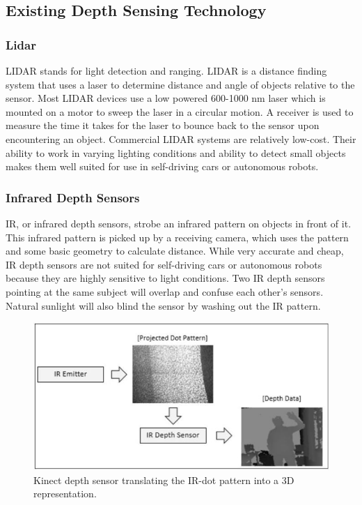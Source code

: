 \documentclass[onecolumn, draftclsnofoot,10pt, compsoc]{IEEEtran}
\makeatletter
\newcommand\captionof[1]{\def\@captype{#1}\caption}
\makeatother
\begin{document}
\begin{singlespace}
	\subsection{Existing Depth Sensing Technology}
		\subsubsection{Lidar}
			LIDAR stands for light detection and ranging.
			LIDAR is a distance finding system that uses a laser to determine distance and angle of objects relative to the sensor.
			Most LIDAR devices use a low powered 600-1000 nm laser which is mounted on a motor to sweep the laser in a circular motion.
			A receiver is used to measure the time it takes for the laser to bounce back to the sensor upon encountering an object.
			Commercial LIDAR systems are relatively low-cost.
			Their ability to work in varying lighting conditions and ability to detect small objects makes them well suited for use in self-driving cars or autonomous robots. \cite{lidar-uk}

		\subsubsection{Infrared Depth Sensors}
			IR, or infrared depth sensors, strobe an infrared pattern on objects in front of it.
			This infrared pattern is picked up by a receiving camera, which uses the pattern and some basic geometry to calculate distance.
			While very accurate and cheap, IR depth sensors are not suited for self-driving cars or autonomous robots because they are highly sensitive to light conditions.
			Two IR depth sensors pointing at the same subject will overlap and confuse each other's sensors.
			Natural sunlight will also blind the sensor by washing out the IR pattern. \cite{ibrahim_2018}

		\begin{figure}[H]
			\includegraphics[scale=0.5]{kinect_depth.jpg}
			\captionof{figure}{Kinect depth sensor translating the IR-dot pattern into a 3D representation. \cite{ibrahim_2018}}
			\label{kinect}
		\end{figure}


\end{singlespace}
\end{document}
